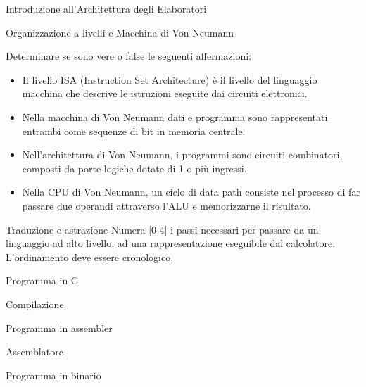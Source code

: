 \documentclass[11pt]{article}
\begin{document}
\begin{quiz}{Introduzione all'Architettura degli Elaboratori}

\begin{cloze}[points=1,shuffle=false]{Organizzazione a livelli e Macchina di Von Neumann}

Determinare se sono vere o false le seguenti affermazioni:
\begin{itemize}
\item Il livello ISA (Instruction Set Architecture) è il livello del linguaggio macchina che descrive le istruzioni eseguite dai circuiti elettronici.
%
\item Nella macchina di Von Neumann dati e programma sono rappresentati entrambi come sequenze di bit in memoria centrale.
%
\item Nell'architettura di Von Neumann, i programmi sono circuiti combinatori, composti da porte logiche dotate di 1 o pi\`u ingressi.
%
\item Nella CPU di Von Neumann, un ciclo di data path consiste nel processo di far passare due operandi attraverso l'ALU e memorizzarne il risultato. 
\end{itemize}
\end{cloze}

\begin{matching}[points=1,shuffle=true]{Traduzione e astrazione}
Numera [0-4] i passi necessari per passare da un linguaggio ad alto livello, ad una rappresentazione eseguibile dal calcolatore. L'ordinamento deve essere cronologico.

\item Programma in C            
\item Compilazione              
\item Programma in assembler    
\item Assemblatore              
\item Programma in binario      
\end{matching}


\end{quiz}
\end{document}
